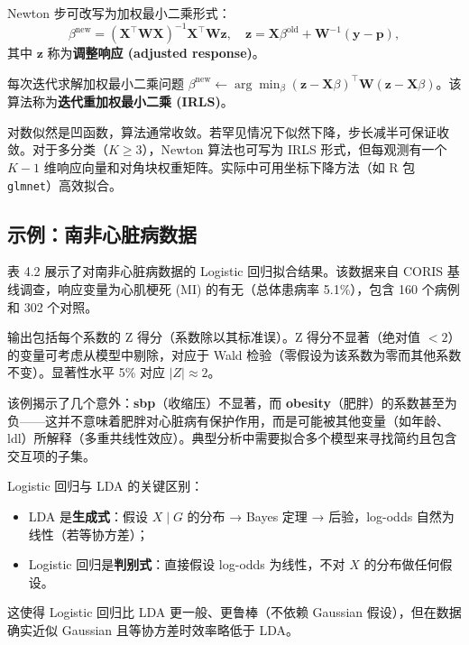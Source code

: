 Newton 步可改写为加权最小二乘形式：
\begin{equation}\label{eq:irls}
    \beta^{\mathrm{new}}
    = (\mathbf{X}^\top\mathbf{W}\mathbf{X})^{-1} \mathbf{X}^\top\mathbf{W}\mathbf{z},
    \quad \mathbf{z} = \mathbf{X}\beta^{\mathrm{old}} + \mathbf{W}^{-1}(\mathbf{y} - \mathbf{p}),
\end{equation}
其中 $\mathbf{z}$ 称为\textbf{调整响应 (adjusted response)}。

每次迭代求解加权最小二乘问题 $\beta^{\mathrm{new}} \leftarrow \arg\min_\beta (\mathbf{z} - \mathbf{X}\beta)^\top \mathbf{W} (\mathbf{z} - \mathbf{X}\beta)$。该算法称为\textbf{迭代重加权最小二乘 (IRLS)}。

\begin{remark}
对数似然是凹函数，算法通常收敛。若罕见情况下似然下降，步长减半可保证收敛。对于多分类（$K \ge 3$），Newton 算法也可写为 IRLS 形式，但每观测有一个 $K-1$ 维响应向量和对角块权重矩阵。实际中可用坐标下降方法（如 R 包 \texttt{glmnet}）高效拟合。
\end{remark}

\subsection{示例：南非心脏病数据}

表 4.2 展示了对南非心脏病数据的 Logistic 回归拟合结果。该数据来自 CORIS 基线调查，响应变量为心肌梗死 (MI) 的有无（总体患病率 5.1\%），包含 160 个病例和 302 个对照。

输出包括每个系数的 Z 得分（系数除以其标准误）。Z 得分不显著（绝对值 $<2$）的变量可考虑从模型中剔除，对应于 Wald 检验（零假设为该系数为零而其他系数不变）。显著性水平 5\% 对应 $|Z| \approx 2$。

该例揭示了几个意外：\textbf{sbp}（收缩压）不显著，而 \textbf{obesity}（肥胖）的系数甚至为负——这并不意味着肥胖对心脏病有保护作用，而是可能被其他变量（如年龄、ldl）所解释（多重共线性效应）。典型分析中需要拟合多个模型来寻找简约且包含交互项的子集。

\begin{remark}
Logistic 回归与 LDA 的关键区别：
\begin{itemize}
    \item LDA 是\textbf{生成式}：假设 $X\mid G$ 的分布 → Bayes 定理 → 后验，log-odds 自然为线性（若等协方差）；
    \item Logistic 回归是\textbf{判别式}：直接假设 log-odds 为线性，不对 $X$ 的分布做任何假设。
\end{itemize}
这使得 Logistic 回归比 LDA 更一般、更鲁棒（不依赖 Gaussian 假设），但在数据确实近似 Gaussian 且等协方差时效率略低于 LDA。
\end{remark}


